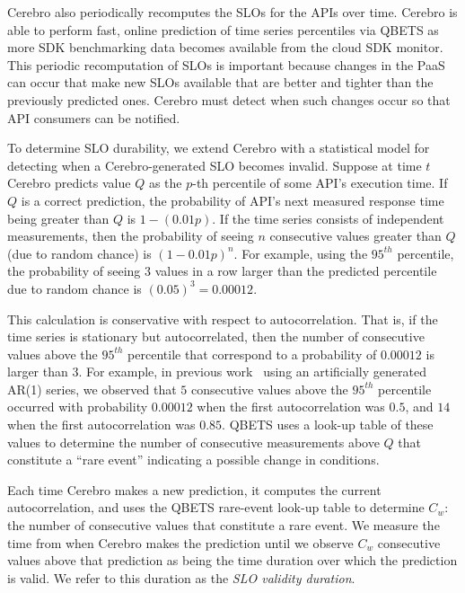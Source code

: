 Cerebro also periodically recomputes the SLOs for the APIs over time. 
Cerebro is able to perform fast, online
prediction of time series percentiles via QBETS as more SDK benchmarking data becomes 
available from the cloud SDK monitor.
This periodic recomputation of SLOs is important because changes in the PaaS
can occur that make new SLOs available that are better and tighter than the
previously predicted ones. Cerebro must detect when such
changes occur so that API consumers can be notified.

To determine SLO durability, we extend Cerebro with a 
statistical model for detecting when a Cerebro-generated SLO becomes invalid. 
Suppose at time $t$ Cerebro predicts value $Q$ as the $p$-th percentile of
some API's execution time.  If $Q$ is a correct prediction,
the probability of API's next measured response time being greater than 
$Q$ is $1-(0.01p)$.  If the time series consists of independent
measurements, then the probability of seeing $n$ consecutive values greater
than $Q$ (due to random chance) is $(1-0.01p)^n$. 
For example, using the $95^{th}$ percentile, the probability of seeing $3$
values in a row larger than the predicted percentile due to random chance
is $(0.05)^3 = 0.00012$.

This calculation is conservative with respect to autocorrelation. That is, if
the time series is stationary but autocorrelated, then the number of consecutive 
values above the $95^{th}$ percentile that correspond to a probability of
$0.00012$ is larger than $3$.  For example, in previous
work~\cite{Nurmi:2007:QQB:1791551.1791556}
using an artificially generated AR(1) series, 
we observed that $5$ consecutive values above the $95^{th}$ percentile
occurred with probability $0.00012$ when the first autocorrelation was $0.5$,
and $14$ when the first autocorrelation was $0.85$. QBETS uses a look-up
table of these values to determine the number of consecutive measurements above
$Q$ that constitute a ``rare event'' indicating a possible change in conditions.

Each time Cerebro makes a new prediction, it computes the current
autocorrelation, and uses the QBETS rare-event look-up table to determine $C_{w}$:
the number of consecutive values that constitute a rare event.
We measure the time from when
Cerebro makes the prediction until we observe $C_{w}$ 
consecutive values above that prediction 
as being the time duration over which
the prediction is valid. 
We refer to this duration as the \textit{SLO validity duration}.

